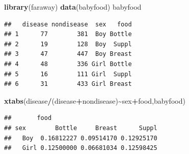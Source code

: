 \documentclass[
  ignorenonframetext,
]{beamer}
\newenvironment{Shaded}{\begin{snugshade}}{\end{snugshade}}
\newcommand{\FunctionTok}[1]{\textcolor[rgb]{0.13,0.29,0.53}{\textbf{#1}}}
\newcommand{\NormalTok}[1]{#1}
\newcommand{\SpecialCharTok}[1]{\textcolor[rgb]{0.81,0.36,0.00}{\textbf{#1}}}
\begin{document}
\begin{frame}[fragile]
\begin{Shaded}
\begin{Highlighting}[]
\FunctionTok{library}\NormalTok{(faraway)}
\FunctionTok{data}\NormalTok{(babyfood)}
\NormalTok{babyfood}
\end{Highlighting}
\end{Shaded}

\begin{verbatim}
##   disease nondisease  sex   food
## 1      77        381  Boy Bottle
## 2      19        128  Boy  Suppl
## 3      47        447  Boy Breast
## 4      48        336 Girl Bottle
## 5      16        111 Girl  Suppl
## 6      31        433 Girl Breast
\end{verbatim}

\begin{Shaded}
\begin{Highlighting}[]
\FunctionTok{xtabs}\NormalTok{(disease}\SpecialCharTok{/}\NormalTok{(disease}\SpecialCharTok{+}\NormalTok{nondisease)}\SpecialCharTok{\textasciitilde{}}\NormalTok{sex}\SpecialCharTok{+}\NormalTok{food,babyfood)}
\end{Highlighting}
\end{Shaded}

\begin{verbatim}
##       food
## sex        Bottle     Breast      Suppl
##   Boy  0.16812227 0.09514170 0.12925170
##   Girl 0.12500000 0.06681034 0.12598425
\end{verbatim}
\end{frame}
\end{document}
